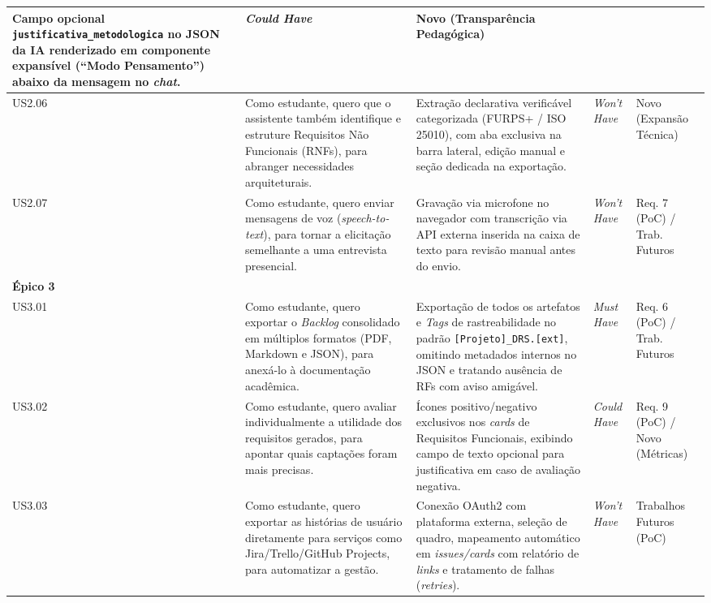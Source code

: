 {\begin{xltabular}{\textwidth}{|l|>{\raggedright\arraybackslash}p{4.0cm}|>{\raggedright\arraybackslash}X|p{1.9cm}|>{\raggedright\arraybackslash}p{2.2cm}|}
    Campo opcional \texttt{justificativa\_\allowbreak metodologica} no JSON da IA renderizado em componente expansível (``Modo Pensamento'') abaixo da mensagem no \textit{chat}. & 
    \textit{Could Have} & Novo (Transparência Pedagógica) \\
    \midrule
    US2.06 & Como estudante, quero que o assistente também identifique e estruture Requisitos Não Funcionais (RNFs), para abranger necessidades arquiteturais. & 
    Extração declarativa verificável categorizada (FURPS+ / ISO 25010), com aba exclusiva na barra lateral, edição manual e seção dedicada na exportação. & 
    \textit{Won't Have} & Novo (Expansão Técnica) \\
    \midrule
    US2.07 & Como estudante, quero enviar mensagens de voz (\textit{speech-to-text}), para tornar a elicitação semelhante a uma entrevista presencial. & 
    Gravação via microfone no navegador com transcrição via API externa inserida na caixa de texto para revisão manual antes do envio. & 
    \textit{Won't Have} & Req. 7 (PoC) / Trab. Futuros \\
    \midrule
    \textbf{Épico 3} &  \\
    \midrule
    US3.01 & Como estudante, quero exportar o \textit{Backlog} consolidado em múltiplos formatos (PDF, Markdown e JSON), para anexá-lo à documentação acadêmica. & 
    Exportação de todos os artefatos e \textit{Tags} de rastreabilidade no padrão \texttt{[Projeto]\_DRS.[ext]}, omitindo metadados internos no JSON e tratando ausência de RFs com aviso amigável. & 
    \textit{Must Have} & Req. 6 (PoC) / Trab. Futuros \\
    \midrule
    US3.02 & Como estudante, quero avaliar individualmente a utilidade dos requisitos gerados, para apontar quais captações foram mais precisas. & 
    Ícones positivo/negativo exclusivos nos \textit{cards} de Requisitos Funcionais, exibindo campo de texto opcional para justificativa em caso de avaliação negativa. & 
    \textit{Could Have} & Req. 9 (PoC) / Novo (Métricas) \\
    \midrule
    US3.03 & Como estudante, quero exportar as histórias de usuário diretamente para serviços como Jira/Trello/GitHub Projects, para automatizar a gestão. & 
    Conexão OAuth2 com plataforma externa, seleção de quadro, mapeamento automático em \textit{issues/cards} com relatório de \textit{links} e tratamento de falhas (\textit{retries}). & 
    \textit{Won't Have} & Trabalhos Futuros (PoC) \\
\end{xltabular}
}

